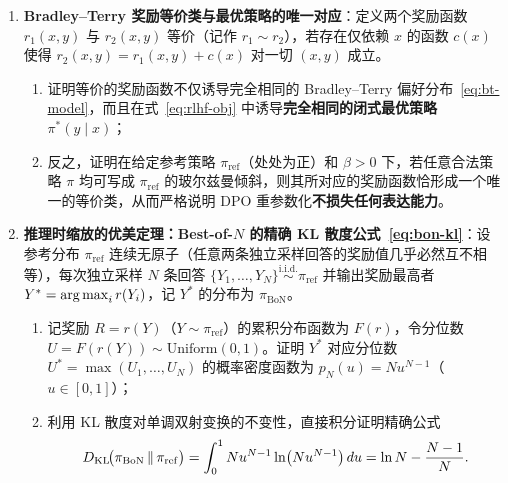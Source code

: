 
\begin{enumerate}
  \item[\textbf{6.4.3}] \textbf{Bradley--Terry 奖励等价类与最优策略的唯一对应}：定义两个奖励函数 $r_1(x, y)$ 与 $r_2(x, y)$ 等价（记作 $r_1 \sim r_2$），若存在仅依赖 $x$ 的函数 $c(x)$ 使得 $r_2(x, y) = r_1(x, y) + c(x)$ 对一切 $(x, y)$ 成立。
  \begin{enumerate}
    \item 证明等价的奖励函数不仅诱导完全相同的 Bradley--Terry 偏好分布~\eqref{eq:bt-model}，而且在式~\eqref{eq:rlhf-obj} 中诱导\textbf{完全相同的闭式最优策略 $\pi^*(y \mid x)$}；
    \item 反之，证明在给定参考策略 $\pi_{\mathrm{ref}}$（处处为正）和 $\beta > 0$ 下，若任意合法策略 $\pi$ 均可写成 $\pi_{\mathrm{ref}}$ 的玻尔兹曼倾斜，则其所对应的奖励函数恰形成一个唯一的等价类，从而严格说明 DPO 重参数化\textbf{不损失任何表达能力}。
  \end{enumerate}

  \item[\textbf{6.4.4}] \textbf{推理时缩放的优美定理：Best-of-$N$ 的精确 KL 散度公式~\eqref{eq:bon-kl}}：设参考分布 $\pi_{\mathrm{ref}}$ 连续无原子（任意两条独立采样回答的奖励值几乎必然互不相等），每次独立采样 $N$ 条回答 $\{Y_1, \dots, Y_N\} \overset{\mathrm{i.i.d.}}{\sim} \pi_{\mathrm{ref}}$ 并输出奖励最高者 $Y^* = \operatorname*{arg\,max}_i r(Y_i)$，记 $Y^*$ 的分布为 $\pi_{\mathrm{BoN}}$。
  \begin{enumerate}
    \item 记奖励 $R = r(Y)$（$Y \sim \pi_{\mathrm{ref}}$）的累积分布函数为 $F(r)$，令分位数 $U = F(r(Y)) \sim \mathrm{Uniform}(0, 1)$。证明 $Y^*$ 对应分位数 $U^* = \max(U_1, \dots, U_N)$ 的概率密度函数为 $p_N(u) = N u^{N-1}$（$u \in [0, 1]$）；
    \item 利用 KL 散度对单调双射变换的不变性，直接积分证明精确公式
    \[
      D_{\mathrm{KL}}\!\big(\pi_{\mathrm{BoN}} \,\|\, \pi_{\mathrm{ref}}\big)
      = \int_0^1 N u^{N-1} \ln\!\big(N u^{N-1}\big)\,du
      = \ln N - \frac{N - 1}{N}.
    \]
  \end{enumerate}
\end{enumerate}

